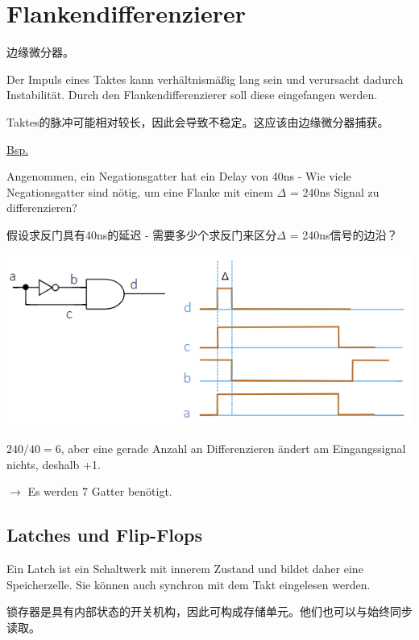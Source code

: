 \documentclass[fleqn]{article}
\begin{document}
\section{Flankendifferenzierer}

边缘微分器。

Der Impuls eines Taktes kann verhältnismäßig lang sein und verursacht dadurch Instabilität. Durch den Flankendifferenzierer soll diese eingefangen werden.

Taktes的脉冲可能相对较长，因此会导致不稳定。这应该由边缘微分器捕获。

\noindent\underline{Bsp.}

Angenommen, ein Negationsgatter hat ein Delay von 40ns - Wie viele Negationsgatter sind nötig, um eine Flanke mit einem $\Delta$ = 240ns Signal zu differenzieren?

假设求反门具有40ns的延迟 - 需要多少个求反门来区分$\Delta$ = 240ns信号的边沿？

\begin{center}
    \includegraphics[scale=0.6]{11.png}
\end{center}

$240/40=6$, aber eine gerade Anzahl an Differenzieren ändert am Eingangssignal nichts, deshalb +1.

$\rightarrow$ Es werden 7 Gatter benötigt.

\subsection{Latches und Flip-Flops}

Ein Latch ist ein Schaltwerk mit innerem Zustand und bildet daher eine Speicherzelle. Sie können auch synchron mit dem Takt eingelesen werden.

锁存器是具有内部状态的开关机构，因此可构成存储单元。他们也可以与始终同步读取。
\end{document}
